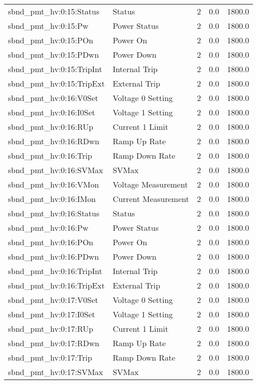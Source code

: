 \begin{center}
\begin{longtable}{l | l l l l }
sbnd\_pmt\_hv:0:15:Status & Status & 2 & 0.0 & 1800.0\\ 
sbnd\_pmt\_hv:0:15:Pw & Power Status & 2 & 0.0 & 1800.0\\ 
sbnd\_pmt\_hv:0:15:POn & Power On & 2 & 0.0 & 1800.0\\ 
sbnd\_pmt\_hv:0:15:PDwn & Power Down & 2 & 0.0 & 1800.0\\ 
sbnd\_pmt\_hv:0:15:TripInt & Internal Trip & 2 & 0.0 & 1800.0\\ 
sbnd\_pmt\_hv:0:15:TripExt & External Trip & 2 & 0.0 & 1800.0\\ 
sbnd\_pmt\_hv:0:16:V0Set & Voltage 0 Setting & 2 & 0.0 & 1800.0\\ 
sbnd\_pmt\_hv:0:16:I0Set & Voltage 1 Setting & 2 & 0.0 & 1800.0\\ 
sbnd\_pmt\_hv:0:16:RUp & Current 1 Limit & 2 & 0.0 & 1800.0\\ 
sbnd\_pmt\_hv:0:16:RDwn & Ramp Up Rate & 2 & 0.0 & 1800.0\\ 
sbnd\_pmt\_hv:0:16:Trip & Ramp Down Rate & 2 & 0.0 & 1800.0\\ 
sbnd\_pmt\_hv:0:16:SVMax & SVMax & 2 & 0.0 & 1800.0\\ 
sbnd\_pmt\_hv:0:16:VMon & Voltage Measurement & 2 & 0.0 & 1800.0\\ 
sbnd\_pmt\_hv:0:16:IMon & Current Measurement & 2 & 0.0 & 1800.0\\ 
sbnd\_pmt\_hv:0:16:Status & Status & 2 & 0.0 & 1800.0\\ 
sbnd\_pmt\_hv:0:16:Pw & Power Status & 2 & 0.0 & 1800.0\\ 
sbnd\_pmt\_hv:0:16:POn & Power On & 2 & 0.0 & 1800.0\\ 
sbnd\_pmt\_hv:0:16:PDwn & Power Down & 2 & 0.0 & 1800.0\\ 
sbnd\_pmt\_hv:0:16:TripInt & Internal Trip & 2 & 0.0 & 1800.0\\ 
sbnd\_pmt\_hv:0:16:TripExt & External Trip & 2 & 0.0 & 1800.0\\ 
sbnd\_pmt\_hv:0:17:V0Set & Voltage 0 Setting & 2 & 0.0 & 1800.0\\ 
sbnd\_pmt\_hv:0:17:I0Set & Voltage 1 Setting & 2 & 0.0 & 1800.0\\ 
sbnd\_pmt\_hv:0:17:RUp & Current 1 Limit & 2 & 0.0 & 1800.0\\ 
sbnd\_pmt\_hv:0:17:RDwn & Ramp Up Rate & 2 & 0.0 & 1800.0\\ 
sbnd\_pmt\_hv:0:17:Trip & Ramp Down Rate & 2 & 0.0 & 1800.0\\ 
sbnd\_pmt\_hv:0:17:SVMax & SVMax & 2 & 0.0 & 1800.0\\ 

\end{longtable}
\end{center}
